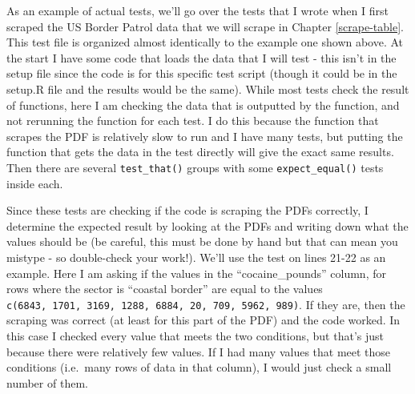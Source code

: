 \documentclass[
  a4paper,
]{krantz}
\begin{document}
As an example of actual tests, we'll go over the tests that
I wrote when I first scraped the US Border Patrol data that
we will scrape in Chapter \ref{scrape-table}. This test file
is organized almost identically to the example one shown
above. At the start I have some code that loads the data
that I will test - this isn't in the setup file since the
code is for this specific test script (though it could be in
the setup.R file and the results would be the same). While
most tests check the result of functions, here I am checking
the data that is outputted by the function, and not
rerunning the function for each test. I do this because the
function that scrapes the PDF is relatively slow to run and
I have many tests, but putting the function that gets the
data in the test directly will give the exact same results.
Then there are several \texttt{test\_that()} groups with
some \texttt{expect\_equal()} tests inside each.

Since these tests are checking if the code is scraping the
PDFs correctly, I determine the expected result by looking
at the PDFs and writing down what the values should be (be
careful, this must be done by hand but that can mean you
mistype - so double-check your work!). We'll use the test on
lines 21-22 as an example. Here I am asking if the values in
the ``cocaine\_pounds'' column, for rows where the sector is
``coastal border'' are equal to the values
\texttt{c(6843,\ 1701,\ 3169,\ 1288,\ 6884,\ 20,\ 709,\ 5962,\ 989)}.
If they are, then the scraping was correct (at least for
this part of the PDF) and the code worked. In this case I
checked every value that meets the two conditions, but
that's just because there were relatively few values. If I
had many values that meet those conditions (i.e.~many rows
of data in that column), I would just check a small number
of them.
\end{document}
